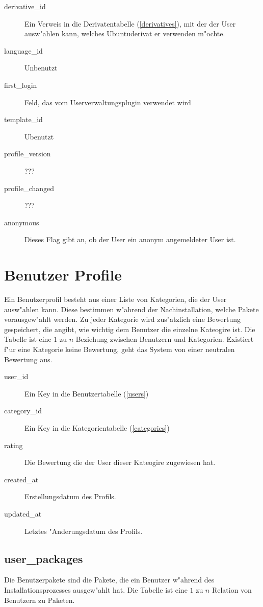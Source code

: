 \documentclass{article}
\begin{document}
\begin{description}
\item[derivative\_id] Ein Verweis in die Derivatentabelle (\ref{derivatives}), mit der der User ausw"ahlen kann, welches Ubuntuderivat er verwenden m"ochte.
\item[language\_id] Unbenutzt
\item[first\_login] Feld, das vom Userverwaltungsplugin verwendet wird
\item[template\_id] Ubenutzt
\item[profile\_version] ???
\item[profile\_changed] ???
\item[anonymous] Dieses Flag gibt an, ob der User ein anonym angemeldeter User ist.
\end{description}

\section{Benutzer Profile}

Ein Benutzerprofil besteht aus einer Liste von Kategorien, die der User ausw"ahlen kann. Diese bestimmen w"ahrend der Nachinstallation, welche Pakete vorausgew"ahlt werden. Zu jeder Kategorie wird zus"atzlich eine Bewertung gespeichert, die angibt, wie wichtig dem Benutzer die einzelne Kateogire ist. Die Tabelle ist eine $1$ zu $n$ Beziehung zwischen Benutzern und Kategorien. Existiert f"ur eine Kategorie keine Bewertung, geht das System von einer neutralen Bewertung aus.

\begin{description}
\item[user\_id] Ein Key in die Benutzertabelle (\ref{users})
\item[category\_id] Ein Key in die Kategorientabelle (\ref{categories})
\item[rating] Die Bewertung die der User dieser Kateogire zugewiesen hat.
\item[created\_at] Erstellungsdatum des Profils.
\item[updated\_at] Letztes "Anderungsdatum des Profils.
\end{description}

\subsection{user\_packages}

Die Benutzerpakete sind die Pakete, die ein Benutzer w"ahrend des Installationsprozesses ausgew"ahlt hat. Die Tabelle ist eine $1$ zu $n$ Relation von Benutzern zu Paketen.
\end{document}
